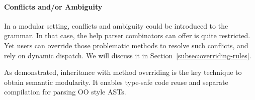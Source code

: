 \vspace{-.05in}
\paragraph{Conflicts and/or Ambiguity} In a modular setting, conflicts and
ambiguity could be introduced to the grammar. In that case, the help parser combinators
can offer is quite restricted. Yet users can override those problematic methods to resolve
such conflicts, and rely on dynamic dispatch. We will discuss it in Section~\ref{subsec:overriding-rules}.

As demonstrated, inheritance with method overriding is the key
technique to obtain semantic modularity.  It enables type-safe code
reuse and separate compilation for parsing OO style ASTs.
